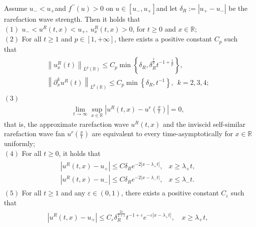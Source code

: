 \documentclass[10pt,a4paper]{amsart}
\begin{document}
	\begin{lemma}\label{lem1}
		Assume \( u_{-} < u_{+} \)and \( f^{\prime \prime}(u) > 0 \) on \( u \in\left[u_{-}, u_{+}\right] \)and let \( \delta_{R}:=\left|u_{+}-u_{-}\right| \) be the rarefaction wave strength. Then it holds that\\
		$(1)$ \( u_{-} < u^{R}(t, x) < u_{+}, \ u_{x}^{R}(t, x) > 0 \), for \( t \geq 0 \) and \( x \in \mathbb{R} \);\\
		$(2)$ For all \( t \geq 1 \) and \( p \in[1,+\infty] \), there exists a positive constant \( C_{p} \) such that
		\begin{align*}
			\begin{array}{l}
				\left\|u_{x}^{R}(t)\right\|_{L^{p}(\mathbb{R})} \leq C_{p} \min \left\{\delta_{R}, \delta_{R}^{\frac{1}{p}} t^{-1+\frac{1}{p}}\right\}, \\
				\left\|\partial_{x}^{k}u^{R}(t)\right\|_{L^{p}(\mathbb{R})} \leq C_{p} \min \left\{\delta_{R}, t^{-1}\right\},\ \ k=2,3,4;
			\end{array}
		\end{align*}
		$(3)$ 
		\begin{align*}
			\lim_{t \to \infty} \sup_{x \in \mathbb{R}}\left|u^{R}(t, x)-u^{r}\left(\frac{x}{t}\right)\right|=0,
		\end{align*}
		that is, the approximate rarefaction wave \( u^{R}(t, x) \) and the inviscid self-similar rarefaction wave fan \( u^{r}\left(\frac{x}{t}\right) \) are equivalent to every time-asymptotically for \( x \in \mathbb{R} \) uniformly;\\
		$(4)$ For all \( t \geq 0 \), it holds that
		\begin{align*}
			\begin{array}{ll}
				\left|u^{R}(t, x)-u_{+}\right| \leq C \delta_{R} e^{-2\left|x-\lambda_{+} t\right|}, & x \geq \lambda_{+} t, \\
				\left|u^{R}(t, x)-u_{-}\right| \leq C \delta_{R} e^{-2\left|x-\lambda_{-} t\right|}, & x \leq \lambda_{-} t.
			\end{array}
		\end{align*}
		$(5)$ For all \( t \geq 1 \) and any \( \varepsilon \in(0,1) \), there exists a positive constant \( C_{\varepsilon} \) such that
		\begin{align*}
			\begin{array}{l}
				\left|u^{R}(t, x)-u_{+}\right| \leq C_{\varepsilon} \delta_{R}^{\frac{2 \varepsilon}{2+\varepsilon}} t^{-1+\varepsilon} e^{-\varepsilon\left|x-\lambda_{+} t\right|}, \quad x \geq \lambda_{+} t, \\

\end{array}
\end{align*}
\end{lemma}
\end{document}
